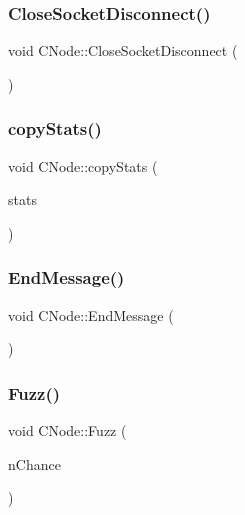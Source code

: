\mbox{\label{class_c_node_a63a6091a0b0fc0987d9436e1ec708423}} 
\subsubsection{\texorpdfstring{Close\+Socket\+Disconnect()}{CloseSocketDisconnect()}}
{\footnotesize\ttfamily void C\+Node\+::\+Close\+Socket\+Disconnect (\begin{DoxyParamCaption}{ }\end{DoxyParamCaption})}

\mbox{\label{class_c_node_aaa77188d9df85b80e3f8a30292acf6a9}} 
\subsubsection{\texorpdfstring{copy\+Stats()}{copyStats()}}
{\footnotesize\ttfamily void C\+Node\+::copy\+Stats (\begin{DoxyParamCaption}\item[{\mbox{\hyperlink{class_c_node_stats}{C\+Node\+Stats}} \&}]{stats }\end{DoxyParamCaption})}

\mbox{\label{class_c_node_af8d4b8c0f883afffcb62d906c31b2cdf}} 
\subsubsection{\texorpdfstring{End\+Message()}{EndMessage()}}
{\footnotesize\ttfamily void C\+Node\+::\+End\+Message (\begin{DoxyParamCaption}{ }\end{DoxyParamCaption})}

\mbox{\label{class_c_node_a39512c4e2c788fb7a09e629b79a69e47}} 
\subsubsection{\texorpdfstring{Fuzz()}{Fuzz()}}
{\footnotesize\ttfamily void C\+Node\+::\+Fuzz (\begin{DoxyParamCaption}\item[{int}]{n\+Chance }\end{DoxyParamCaption})\hspace{0.3cm}{\ttfamily [protected]}}

